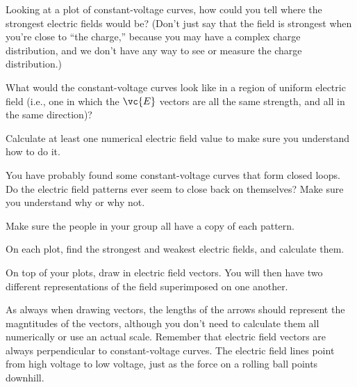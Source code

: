 \prelab

\prelabquestion  Looking at a plot of constant-voltage curves, how could you
tell where the strongest electric fields would be? (Don't
just say that the field is strongest when you're close to
``the charge,'' because you may have a complex charge
distribution, and we don't have any way to see or measure
the charge distribution.)

\prelabquestion What would the constant-voltage curves look
like in a region of uniform electric field (i.e., one in which
the $\vc{E}$ vectors are all the same strength, and all in the
same direction)?

\selfcheck

Calculate at least one numerical electric field value to
make sure you understand how to do it.

You have probably found some constant-voltage curves that form closed
loops. Do the electric field patterns ever seem to close back on themselves?
Make sure you understand why or why not.

Make sure the people in your group all have a copy of each pattern.

\analysis

On each plot, find the strongest and weakest electric fields, and
calculate them.

On top of your plots, draw in electric field vectors. You will then
have two different representations of the field superimposed
on one another.

As always when
drawing vectors, the lengths of the arrows should represent
the magntitudes of the vectors, although you don't need to
calculate them all numerically or use an actual scale.
Remember that
electric field vectors are always perpendicular to constant-voltage
curves.
The electric field
lines point from high voltage to low voltage, just as the
force on a rolling ball points downhill.
